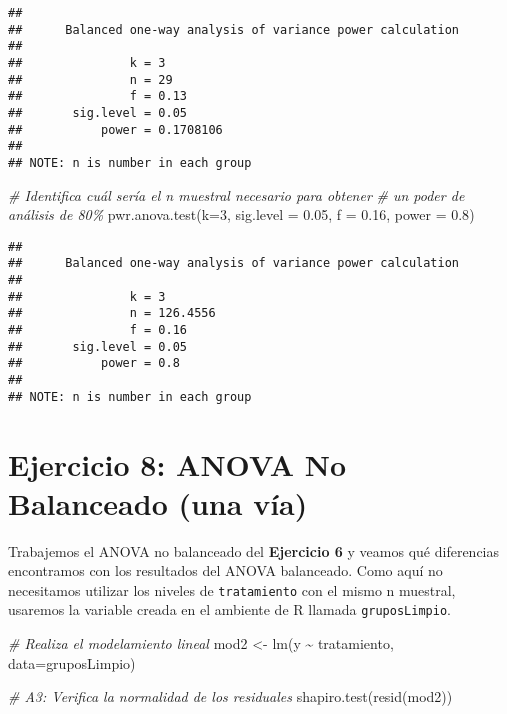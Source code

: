 \documentclass[
]{article}
\newenvironment{Shaded}{}{}
\newcommand{\AttributeTok}[1]{\textcolor[rgb]{0.49,0.56,0.16}{#1}}
\newcommand{\CommentTok}[1]{\textcolor[rgb]{0.38,0.63,0.69}{\textit{#1}}}
\newcommand{\DecValTok}[1]{\textcolor[rgb]{0.25,0.63,0.44}{#1}}
\newcommand{\FloatTok}[1]{\textcolor[rgb]{0.25,0.63,0.44}{#1}}
\newcommand{\FunctionTok}[1]{\textcolor[rgb]{0.02,0.16,0.49}{#1}}
\newcommand{\NormalTok}[1]{#1}
\newcommand{\OtherTok}[1]{\textcolor[rgb]{0.00,0.44,0.13}{#1}}
\newcommand{\SpecialCharTok}[1]{\textcolor[rgb]{0.25,0.44,0.63}{#1}}
\begin{document}
\begin{verbatim}
## 
##      Balanced one-way analysis of variance power calculation 
## 
##               k = 3
##               n = 29
##               f = 0.13
##       sig.level = 0.05
##           power = 0.1708106
## 
## NOTE: n is number in each group
\end{verbatim}

\begin{Shaded}
\begin{Highlighting}[]
\CommentTok{\# Identifica cuál sería el n muestral necesario para obtener}
\CommentTok{\# un poder de análisis de 80\%}
\FunctionTok{pwr.anova.test}\NormalTok{(}\AttributeTok{k=}\DecValTok{3}\NormalTok{, }\AttributeTok{sig.level =} \FloatTok{0.05}\NormalTok{, }\AttributeTok{f =} \FloatTok{0.16}\NormalTok{, }\AttributeTok{power =} \FloatTok{0.8}\NormalTok{)}
\end{Highlighting}
\end{Shaded}

\begin{verbatim}
## 
##      Balanced one-way analysis of variance power calculation 
## 
##               k = 3
##               n = 126.4556
##               f = 0.16
##       sig.level = 0.05
##           power = 0.8
## 
## NOTE: n is number in each group
\end{verbatim}

\hypertarget{ejercicio-8-anova-no-balanceado-una-vuxeda}{%
\section{\texorpdfstring{\textbf{Ejercicio 8: ANOVA No Balanceado (una
vía)}}{Ejercicio 8: ANOVA No Balanceado (una vía)}}\label{ejercicio-8-anova-no-balanceado-una-vuxeda}}

Trabajemos el ANOVA no balanceado del \textbf{Ejercicio 6} y veamos qué
diferencias encontramos con los resultados del ANOVA balanceado. Como
aquí no necesitamos utilizar los niveles de \texttt{tratamiento} con el
mismo n muestral, usaremos la variable creada en el ambiente de R
llamada \texttt{gruposLimpio}.

\begin{Shaded}
\begin{Highlighting}[]
\CommentTok{\# Realiza el modelamiento lineal}
\NormalTok{mod2 }\OtherTok{\textless{}{-}} \FunctionTok{lm}\NormalTok{(y }\SpecialCharTok{\textasciitilde{}}\NormalTok{ tratamiento, }\AttributeTok{data=}\NormalTok{gruposLimpio)}

\CommentTok{\# A3: Verifica la normalidad de los residuales}
\FunctionTok{shapiro.test}\NormalTok{(}\FunctionTok{resid}\NormalTok{(mod2))}
\end{Highlighting}
\end{Shaded}
\end{document}
